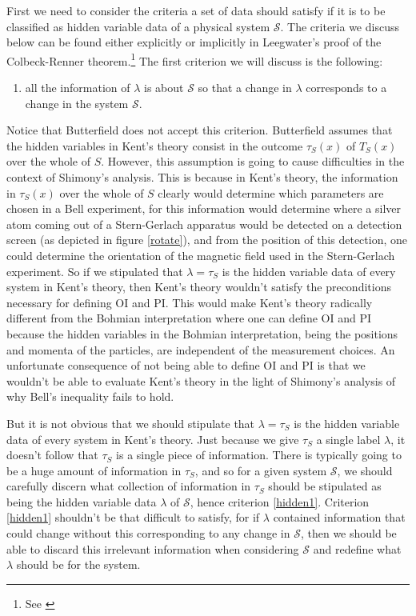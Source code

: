\documentclass[12pt]{report}
\begin{document}
First we need to consider the criteria a set of data should satisfy if it is to be classified as hidden variable data of a physical system $\mathcal{S}$. The criteria we discuss below can be found either explicitly or implicitly in Leegwater's proof of the Colbeck-Renner theorem.\footnote{See \cite{LeegwaterGijs2016Aitf}} The first criterion we will discuss is the following:
\begin{enumerate}
	\item all the information of $\lambda$ is about $\mathcal{S}$ so that a change in $\lambda$ corresponds to a change in the system $\mathcal{S}$.\label{hidden1}
\end{enumerate} 
Notice that Butterfield does not accept this criterion. Butterfield assumes that the hidden variables in Kent's theory consist in the outcome $\tau_S(x)$ of $T_S(x)$ over the whole of $S$. However, this assumption is going to cause difficulties in the context of Shimony's analysis. This is because in Kent's theory, the information in $\tau_S(x)$ over the whole of $S$ clearly would determine which parameters are chosen in a Bell experiment, for this information would determine where a silver atom coming out of a Stern-Gerlach apparatus would be detected on a detection screen (as depicted in figure \ref{rotate}), and from the position of this detection, one could determine the orientation of the magnetic field used in the Stern-Gerlach experiment. So if we stipulated that $\lambda=\tau_S$ is the hidden variable data of every system in Kent's theory, then Kent's theory wouldn't satisfy the preconditions necessary for defining OI and PI. This would make Kent's theory radically different from the Bohmian interpretation where one can define OI and PI because the hidden variables in the Bohmian interpretation, being the positions and momenta of the particles, are independent of the measurement choices. An unfortunate consequence of not being able to define OI and PI is that we wouldn't be able to evaluate Kent's theory in the light of Shimony's analysis of why Bell's inequality fails to hold. 

But it is not obvious that we should stipulate that $\lambda=\tau_S$ is the hidden variable data of every system in Kent's theory. Just because we give $\tau_S$ a single label $\lambda$, it doesn't follow that $\tau_S$ is a single piece of information. There is typically going to be a huge amount of information in $\tau_S$, and so for a given system $\mathcal{S}$, we should carefully discern  what collection of information in $\tau_S$ should be stipulated as being the hidden variable data $\lambda$ of $\mathcal{S}$, hence criterion \ref{hidden1}. Criterion \ref{hidden1} shouldn't be that difficult to satisfy, for if $\lambda$ contained information that could change without this corresponding to any change in $\mathcal{S}$, then we should be able to discard this irrelevant information when considering $\mathcal{S}$ and redefine what $\lambda$ should be for the system. 
\end{document}
